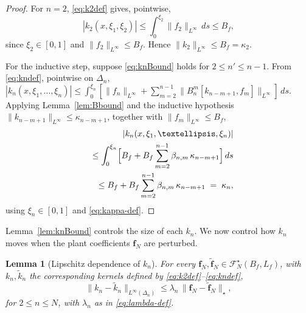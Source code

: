 \documentclass[10pt,a4paper]{amsart}
\newcommand{\Linf}{L^\infty}
\newtheorem{lemma}{Lemma}
\begin{document}
\begin{proof}
For $n=2$, \eqref{eq:k2def} gives, pointwise,
\begin{equation}
|k_2(x,\xi_1,\xi_2)| \le \int_0^{\xi_2} \|f_2\|_{\Linf}\,ds \le B_f,
\label{eq:k2-pw}
\end{equation}
since $\xi_2\in[0,1]$ and $\|f_2\|_{\Linf}\le B_f$. Hence $\|k_2\|_{\Linf}\le B_f = \kappa_2$.

For the inductive step, suppose \eqref{eq:knBound} holds for $2\le n'\le n-1$. From \eqref{eq:kndef}, pointwise on $\Delta_n$, $|k_n(x,\xi_1,\ldots,\xi_n)| \le \int_0^{\xi_n} [\|f_n\|_{\Linf} + \sum_{m=2}^{n-1} \|B_n^m[k_{n-m+1},f_m]\|_{\Linf}]\,ds$. Applying Lemma~\ref{lem:Bbound} and the inductive hypothesis $\|k_{n-m+1}\|_{\Linf}\le\kappa_{n-m+1}$, together with $\|f_m\|_{\Linf}\le B_f$,
\begin{eqnarray}
&& |k_n(x,\xi_1,\ldots,\xi_n)| \nonumber \\
&& \le \int_0^{\xi_n}\Bigl[B_f + B_f\sum_{m=2}^{n-1} \beta_{n,m}\,\kappa_{n-m+1}\Bigr]\,ds \nonumber \\
&& \le B_f + B_f\sum_{m=2}^{n-1} \beta_{n,m}\,\kappa_{n-m+1}
\;=\; \kappa_n,
\label{eq:kn-pw-2}
\end{eqnarray}
using $\xi_n\in[0,1]$ and \eqref{eq:kappa-def}.
\end{proof}

Lemma~\ref{lem:knBound} controls the size of each $k_n$. We now control how $k_n$ moves when the plant coefficients $\mathbf{f}_N$ are perturbed.

\begin{lemma}[Lipschitz dependence of $k_n$]
\label{lem:knLip}
For every $\mathbf{f}_N,\tilde{\mathbf{f}}_N\in\mathcal{F}_N^\star(B_f,L_f)$, with $k_n,\tilde k_n$ the corresponding kernels defined by \eqref{eq:k2def}--\eqref{eq:kndef},
\begin{equation}
\|k_n - \tilde k_n\|_{\Linf(\Delta_n)}
\le \lambda_n\,\|\mathbf{f}_N-\tilde{\mathbf{f}}_N\|_\star,
\label{eq:knLip}
\end{equation}
for $2\le n\le N$, with $\lambda_n$ as in \eqref{eq:lambda-def}.
\end{lemma}
\end{document}
